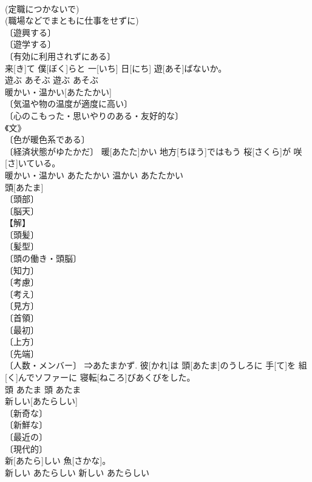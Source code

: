 \documentclass[8pt]{extreport}
\begin{document}
\begin{CJK}{UTF8}{min}
\\	(定職につかないで) 
\\	(職場などでまともに仕事をせずに) 
\\	〔遊興する〕 
\\	〔遊学する〕 
\\	〔有効に利用されずにある〕 
\\	[⇒あそばせる 
\\	〔もてあそぶ〕	明日[あした] 来[き]て 僕[ぼく]らと 一[いち] 日[にち] 遊[あそ]ばないか。	
\\	遊ぶ	あそぶ	遊ぶ	あそぶ	
\\	暖かい・温かい[あたたかい]	
\\	〔気温や物の温度が適度に高い〕 
\\	〔心のこもった・思いやりのある・友好的な〕 
\\	《文》 
\\	〔色が暖色系である〕 
\\	〔経済状態がゆたかだ〕	暖[あたた]かい 地方[ちほう]ではもう 桜[さくら]が 咲[さ]いている。	
\\	暖かい・温かい	あたたかい	温かい	あたたかい	
\\	頭[あたま]	
\\	〔頭部〕 
\\	〔脳天〕 
\\	【解】 
\\	〔頭髪〕 
\\	〔髪型〕 
\\	〔頭の働き・頭脳〕 
\\	〔知力〕 
\\	〔考慮〕 
\\	〔考え〕 
\\	〔見方〕 
\\	〔首領〕 
\\	〔最初〕 
\\	〔上方〕 
\\	〔先端〕 
\\	〔人数・メンバー〕 ⇒あたまかず.	彼[かれ]は 頭[あたま]のうしろに 手[て]を 組[く]んでソファーに 寝転[ねころ]びあくびをした。	
\\	頭	あたま	頭	あたま	
\\	新しい[あたらしい]	
\\	〔新奇な〕 
\\	〔新鮮な〕 
\\	〔最近の〕 
\\	〔現代的〕 
\\	新[あたら]しい 魚[さかな]。	
\\	新しい	あたらしい	新しい	あたらしい	

\end{CJK}
\end{document}

